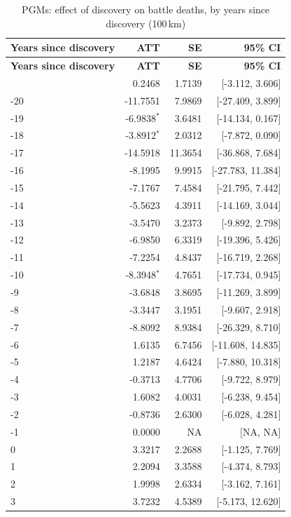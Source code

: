 \begin{longtable}{lrrr}
\caption{PGMs: effect of discovery on battle deaths, by years since discovery (100\,km)} \label{tab:pgms_battle_deaths_best_} \\
\toprule
\textbf{Years since discovery} & \textbf{ATT} & \textbf{SE} & \textbf{95\% CI} \\
\midrule \endfirsthead
\toprule
\textbf{Years since discovery} & \textbf{ATT} & \textbf{SE} & \textbf{95\% CI} \\
\midrule \endhead
\bottomrule \endlastfoot
-21 & 0.2468 & 1.7139 & [-3.112, 3.606] \\
-20 & -11.7551 & 7.9869 & [-27.409, 3.899] \\
-19 & -6.9838$^{*}$ & 3.6481 & [-14.134, 0.167] \\
-18 & -3.8912$^{*}$ & 2.0312 & [-7.872, 0.090] \\
-17 & -14.5918 & 11.3654 & [-36.868, 7.684] \\
-16 & -8.1995 & 9.9915 & [-27.783, 11.384] \\
-15 & -7.1767 & 7.4584 & [-21.795, 7.442] \\
-14 & -5.5623 & 4.3911 & [-14.169, 3.044] \\
-13 & -3.5470 & 3.2373 & [-9.892, 2.798] \\
-12 & -6.9850 & 6.3319 & [-19.396, 5.426] \\
-11 & -7.2254 & 4.8437 & [-16.719, 2.268] \\
-10 & -8.3948$^{*}$ & 4.7651 & [-17.734, 0.945] \\
-9 & -3.6848 & 3.8695 & [-11.269, 3.899] \\
-8 & -3.3447 & 3.1951 & [-9.607, 2.918] \\
-7 & -8.8092 & 8.9384 & [-26.329, 8.710] \\
-6 & 1.6135 & 6.7456 & [-11.608, 14.835] \\
-5 & 1.2187 & 4.6424 & [-7.880, 10.318] \\
-4 & -0.3713 & 4.7706 & [-9.722, 8.979] \\
-3 & 1.6082 & 4.0031 & [-6.238, 9.454] \\
-2 & -0.8736 & 2.6300 & [-6.028, 4.281] \\
-1 & 0.0000 & NA & [NA, NA] \\
0 & 3.3217 & 2.2688 & [-1.125, 7.769] \\
1 & 2.2094 & 3.3588 & [-4.374, 8.793] \\
2 & 1.9998 & 2.6334 & [-3.162, 7.161] \\
3 & 3.7232 & 4.5389 & [-5.173, 12.620] \\

\end{longtable}
